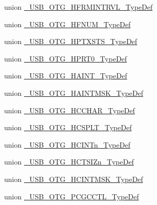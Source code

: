 \begin{DoxyCompactItemize}
\item 
union \hyperlink{union___u_s_b___o_t_g___h_f_r_m_i_n_t_r_v_l___type_def}{\-\_\-\-U\-S\-B\-\_\-\-O\-T\-G\-\_\-\-H\-F\-R\-M\-I\-N\-T\-R\-V\-L\-\_\-\-Type\-Def}
\item 
union \hyperlink{union___u_s_b___o_t_g___h_f_n_u_m___type_def}{\-\_\-\-U\-S\-B\-\_\-\-O\-T\-G\-\_\-\-H\-F\-N\-U\-M\-\_\-\-Type\-Def}
\item 
union \hyperlink{union___u_s_b___o_t_g___h_p_t_x_s_t_s___type_def}{\-\_\-\-U\-S\-B\-\_\-\-O\-T\-G\-\_\-\-H\-P\-T\-X\-S\-T\-S\-\_\-\-Type\-Def}
\item 
union \hyperlink{union___u_s_b___o_t_g___h_p_r_t0___type_def}{\-\_\-\-U\-S\-B\-\_\-\-O\-T\-G\-\_\-\-H\-P\-R\-T0\-\_\-\-Type\-Def}
\item 
union \hyperlink{union___u_s_b___o_t_g___h_a_i_n_t___type_def}{\-\_\-\-U\-S\-B\-\_\-\-O\-T\-G\-\_\-\-H\-A\-I\-N\-T\-\_\-\-Type\-Def}
\item 
union \hyperlink{union___u_s_b___o_t_g___h_a_i_n_t_m_s_k___type_def}{\-\_\-\-U\-S\-B\-\_\-\-O\-T\-G\-\_\-\-H\-A\-I\-N\-T\-M\-S\-K\-\_\-\-Type\-Def}
\item 
union \hyperlink{union___u_s_b___o_t_g___h_c_c_h_a_r___type_def}{\-\_\-\-U\-S\-B\-\_\-\-O\-T\-G\-\_\-\-H\-C\-C\-H\-A\-R\-\_\-\-Type\-Def}
\item 
union \hyperlink{union___u_s_b___o_t_g___h_c_s_p_l_t___type_def}{\-\_\-\-U\-S\-B\-\_\-\-O\-T\-G\-\_\-\-H\-C\-S\-P\-L\-T\-\_\-\-Type\-Def}
\item 
union \hyperlink{union___u_s_b___o_t_g___h_c_i_n_tn___type_def}{\-\_\-\-U\-S\-B\-\_\-\-O\-T\-G\-\_\-\-H\-C\-I\-N\-Tn\-\_\-\-Type\-Def}
\item 
union \hyperlink{union___u_s_b___o_t_g___h_c_t_s_i_zn___type_def}{\-\_\-\-U\-S\-B\-\_\-\-O\-T\-G\-\_\-\-H\-C\-T\-S\-I\-Zn\-\_\-\-Type\-Def}
\item 
union \hyperlink{union___u_s_b___o_t_g___h_c_i_n_t_m_s_k___type_def}{\-\_\-\-U\-S\-B\-\_\-\-O\-T\-G\-\_\-\-H\-C\-I\-N\-T\-M\-S\-K\-\_\-\-Type\-Def}
\item 
union \hyperlink{union___u_s_b___o_t_g___p_c_g_c_c_t_l___type_def}{\-\_\-\-U\-S\-B\-\_\-\-O\-T\-G\-\_\-\-P\-C\-G\-C\-C\-T\-L\-\_\-\-Type\-Def}
\end{DoxyCompactItemize}
